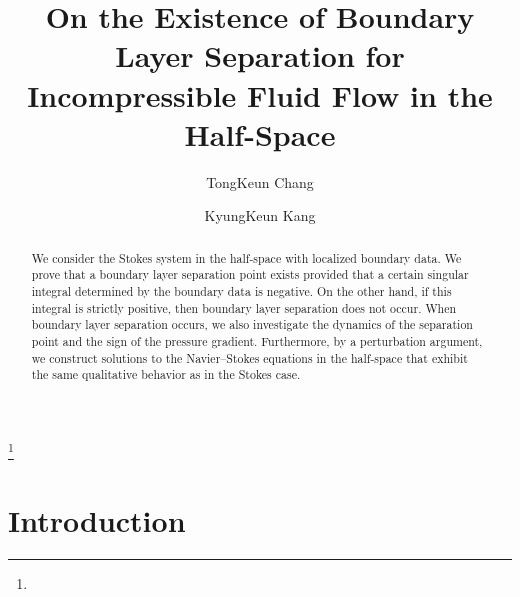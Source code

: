 \documentclass{amsart}
\numberwithin{equation}{section}
\begin{document}
\title[Boundary Layer Separation for Incompressible Fluid Flow ]{On the Existence of Boundary Layer Separation for Incompressible Fluid Flow in the Half-Space}
%

\author{TongKeun Chang}
\address{TongKeun chang: Department of
Mathematics, Yonsei University, 50 Yonsei-ro, Seodaemun-gu, Seoul,
South Korea 120-749 } 

\author{KyungKeun Kang}
\address{KyungKeun Kang : Department of
Mathematics, Yonsei University, 50 Yonsei-ro, Seodaemun-gu, Seoul,
South Korea 120-749 } 


\thanks{  }
 

\date{}



\makeatletter
{}
\makeatother
{}



 

 
\begin{abstract}
We consider the Stokes system in the half-space with localized boundary data. We prove that a boundary layer separation point exists provided that a certain singular integral determined by the boundary data is negative. On the other hand, if this integral is strictly positive, then boundary layer separation does not occur.
When boundary layer separation occurs, we also investigate the dynamics of the separation point and the sign of the pressure gradient. Furthermore, by a perturbation argument, we construct solutions to the Navier--Stokes equations in the half-space that exhibit the same qualitative behavior as in the Stokes case.
\end{abstract}
\maketitle

 

\section{Introduction}
\end{document}

